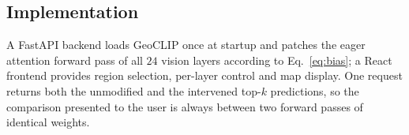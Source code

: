 \subsection{Implementation}

A FastAPI backend loads GeoCLIP once at startup and patches the eager
attention forward pass of all $24$ vision layers according to
Eq.~\ref{eq:bias}; a React frontend provides region selection, per-layer
control and map display. One request returns both the unmodified and the
intervened top-$k$ predictions, so the comparison presented to the user is
always between two forward passes of identical weights.
